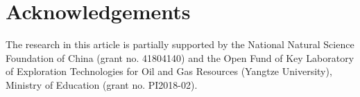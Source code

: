 \section{Acknowledgements}
The research in this article is partially supported by the National Natural Science Foundation of China (grant no. 41804140) and the Open Fund of Key Laboratory of Exploration Technologies for Oil and Gas Resources (Yangtze University), Ministry of Education (grant no. PI2018-02).





